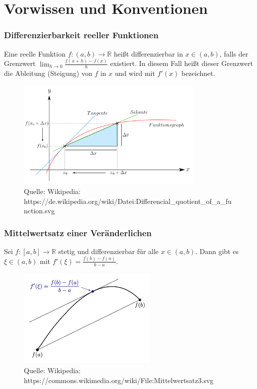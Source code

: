 
\section{Vorwissen und Konventionen}

\subsubsection*{Differenzierbarkeit reeller Funktionen} 
Eine reelle Funktion $f : (a, b) \to \mathbb{R}$  heißt differenzierbar in $x \in (a,b)$, falls der Grenzwert $\lim_{h \to 0}  \frac{f(x +h) - f(x)}  {h}$ existiert. In diesem Fall heißt dieser Grenzwert die Ableitung (Steigung) von $f$ in $x$ und wird mit $f' (x)$ bezeichnet.
\begin{figure}[H]
      \centering
    \includegraphics[width=0.8\textwidth]{images/Differencial_quotient_of_a_function}
      \caption{Quelle: Wikipedia: https://de.wikipedia.org/wiki/Datei:Differencial\_quotient\_of\_a\_function.svg}
\end{figure}

\subsubsection*{Mittelwertsatz einer Veränderlichen} 

Sei $f : [a,b] \to \mathbb{R}$ stetig und differenzierbar für alle $x \in (a,b)$. Dann gibt es $\xi \in (a,b)$ mit
$f'(\xi) = \frac{f(b) - f(a)} { b-a}$.
\begin{figure}[H]
      \centering
    \includegraphics[width=0.6\textwidth]{images/Mittelwertsatz3.png}
      \caption{Quelle: Wikipedia: https://commons.wikimedia.org/wiki/File:Mittelwertsatz3.svg}
\end{figure}

